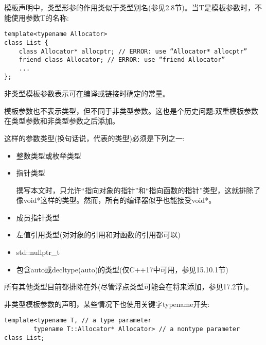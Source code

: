 模板声明中，类型形参的作用类似于类型别名(参见2.8节)。当T是模板参数时，不能使用参数T的名称:

\begin{lstlisting}[style=styleCXX]
template<typename Allocator>
class List {
	class Allocator* allocptr; // ERROR: use “Allocator* allocptr”
	friend class Allocator; // ERROR: use “friend Allocator”
	...
};
\end{lstlisting}


非类型模板参数表示可在编译或链接时确定的常量。

\begin{tcolorbox}[colback=webgreen!5!white,colframe=webgreen!75!black]
\hspace*{0.75cm}模板参数也不表示类型，但不同于非类型参数。这也是个历史问题:双重模板参数在类型参数和非类型参数之后添加。
\end{tcolorbox}

这样的参数类型(换句话说，代表的类型)必须是下列之一:

\begin{itemize}
\item 
整数类型或枚举类型

\item 
指针类型

\begin{tcolorbox}[colback=webgreen!5!white,colframe=webgreen!75!black]
\hspace*{0.75cm}撰写本文时，只允许“指向对象的指针”和“指向函数的指针”类型，这就排除了像void*这样的类型。然而，所有的编译器似乎也能接受void*。
\end{tcolorbox}

\item 
成员指针类型

\item
左值引用类型(对对象的引用和对函数的引用都可以)

\item 
std::nullptr\_t

\item 
包含auto或decltype(auto)的类型(仅C++17中可用，参见15.10.1节)
\end{itemize}

所有其他类型目前都排除在外(尽管浮点类型可能会在将来添加，参见17.2节)。

非类型模板参数的声明，某些情况下也使用关键字typename开头:

\begin{lstlisting}[style=styleCXX]
template<typename T, // a type parameter
		typename T::Allocator* Allocator> // a nontype parameter
class List;
\end{lstlisting}

